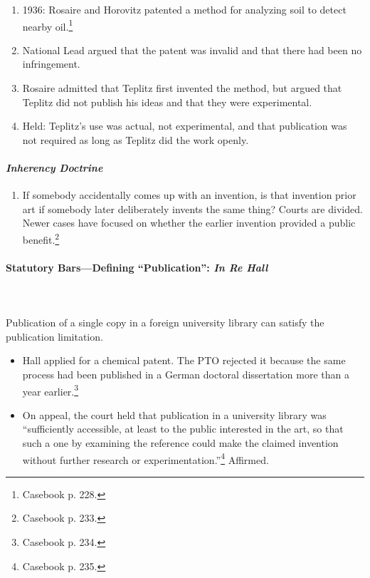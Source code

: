 \begin{enumerate}
    \item 1936: Rosaire and Horovitz patented a method for analyzing soil to 
    detect nearby oil.\footnote{Casebook p. 228.}
    \item National Lead argued that the patent was invalid and that there had 
    been no infringement.
    \item Rosaire admitted that Teplitz first invented the method, but argued 
    that Teplitz did not publish his ideas and that they were experimental.
    \item Held: Teplitz's use was actual, not experimental, and that 
    publication was not required as long as Teplitz did the work openly.
\end{enumerate}

\paragraph{\emph{Inherency Doctrine}} 

\begin{enumerate}
    \item If somebody accidentally comes up with an invention, is that 
    invention prior art if somebody later deliberately invents the same thing? 
    Courts are divided. Newer cases have focused on whether the earlier 
    invention provided a public benefit.\footnote{Casebook p. 233.}
\end{enumerate}

\paragraph{Statutory Bars---Defining ``Publication'': \emph{In Re Hall}}
~\\\\
Publication of a single copy in a foreign university library can satisfy 
the publication limitation.

\begin{itemize}
    \item Hall applied for a chemical patent. The PTO rejected it because the 
    same process had been published in a German doctoral dissertation more than 
    a year earlier.\footnote{Casebook p. 234.}
    \item On appeal, the court held that publication in a university library was 
    ``sufficiently accessible, at least to the public interested in the art, so 
    that such a one by examining the reference could make the claimed invention 
    without further research or experimentation.''\footnote{Casebook p. 235.} 
    Affirmed.
\end{itemize}

